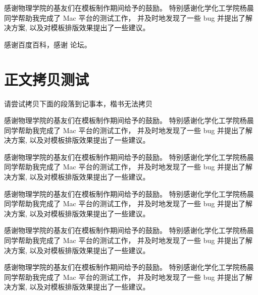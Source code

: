 \documentclass[pageheader,chapter,shorttitle,mathtxf]{NJUbachelor}
\begin{document}








%



\newpage
{}

\nocite{*}

%


\ack

感谢物理学院的基友们在模板制作期间给予的鼓励。
特别感谢化学化工学院杨晨同学帮助我完成了 Mac 平台的测试工作，
并及时地发现了一些 bug 并提出了解决方案,
以及对模板排版效果提出了一些建议。

感谢百度百科，感谢 \CTeX{} 论坛。


\appendix

\chapter{正文拷贝测试}

{\noindent\Large\xinwei
请尝试拷贝下面的段落到记事本，楷书无法拷贝}

\vspace{0.5em}

\heiti
感谢物理学院的基友们在模板制作期间给予的鼓励。
特别感谢化学化工学院杨晨同学帮助我完成了 Mac 平台的测试工作，
并及时地发现了一些 bug 并提出了解决方案,
以及对模板排版效果提出了一些建议。

\fangsong
感谢物理学院的基友们在模板制作期间给予的鼓励。
特别感谢化学化工学院杨晨同学帮助我完成了 Mac 平台的测试工作，
并及时地发现了一些 bug 并提出了解决方案,
以及对模板排版效果提出了一些建议。

\kaishu
感谢物理学院的基友们在模板制作期间给予的鼓励。
特别感谢化学化工学院杨晨同学帮助我完成了 Mac 平台的测试工作，
并及时地发现了一些 bug 并提出了解决方案,
以及对模板排版效果提出了一些建议。

\hupo
感谢物理学院的基友们在模板制作期间给予的鼓励。
特别感谢化学化工学院杨晨同学帮助我完成了 Mac 平台的测试工作，
并及时地发现了一些 bug 并提出了解决方案,
以及对模板排版效果提出了一些建议。

\xinwei
感谢物理学院的基友们在模板制作期间给予的鼓励。
特别感谢化学化工学院杨晨同学帮助我完成了 Mac 平台的测试工作，
并及时地发现了一些 bug 并提出了解决方案,
以及对模板排版效果提出了一些建议。
\end{document}
